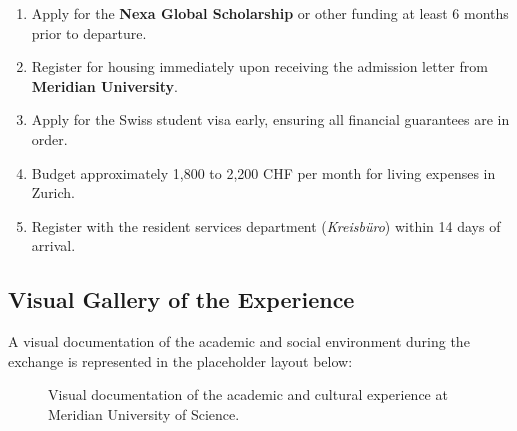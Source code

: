 \vspace{5pt}
\begin{tcolorbox}[
  colback=lightgray,
  colframe=primarycolor,
  arc=4pt,
  boxrule=1pt,
  title=\sffamily\bfseries\color{white}\faCheckCircle\quad Mandatory Administrative Steps
]
  \begin{enumerate}[label=\textbf{\arabic*.}]
    \item Apply for the \textbf{Nexa Global Scholarship} or other funding at least 6 months prior to departure.
    \item Register for housing immediately upon receiving the admission letter from \textbf{Meridian University}.
    \item Apply for the Swiss student visa early, ensuring all financial guarantees are in order.
    \item Budget approximately 1,800 to 2,200 CHF per month for living expenses in Zurich.
    \item Register with the resident services department (\emph{Kreisbüro}) within 14 days of arrival.
  \end{enumerate}
\end{tcolorbox}
\vspace{5pt}

\subsection{Visual Gallery of the Experience}
A visual documentation of the academic and social environment during the exchange is represented in the placeholder layout below:

\begin{figure}[htbp]
  \centering
  \caption{Visual documentation of the academic and cultural experience at Meridian University of Science.}
  \label{fig:photo_grid}
\end{figure}


